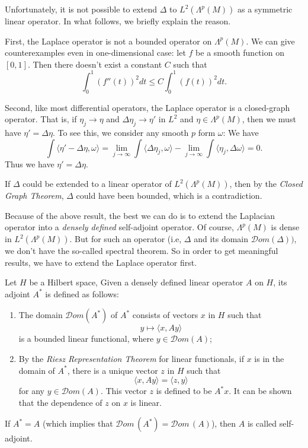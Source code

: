 Unfortunately, it is not possible to extend $\Delta$ to $L^2(\Lambda^p(M))$ as a symmetric linear operator. In what follows, we briefly explain the reason.


First, the Laplace operator is not a bounded operator on $\Lambda^p(M)$. We can give counterexamples even in one-dimensional case: let $f$ be a smooth function on $[0,1]$. Then there doesn't exist a constant $C$ such that
\[
\int_0^1(f''(t))^2 dt\leq C\int_0^1(f(t))^2 dt.
\]

Second, like most differential operators, the Laplace operator is a closed-graph operator. That is, if $\eta_j\to \eta$ and $\Delta\eta_j\to\eta'$ in $L^2$ and $\eta\in\Lambda^p(M)$, then we must have $\eta'=\Delta\eta$.
To see this, we consider any smooth $p$ form $\omega$:
We have 
\[
\int\langle\eta'-\Delta\eta,\omega\rangle=\lim_{j\to\infty}\int
\langle\Delta\eta_j,\omega\rangle-\lim_{j\to\infty}\int\langle\eta_j,\Delta\omega\rangle=0.
\]
Thus we have $\eta'=\Delta\eta$.

If $\Delta$ could be extended to a linear operator of $L^2(\Lambda^p(M))$, then by the {\it Closed
Graph Theorem}, $\Delta$ could have been bounded, which is a contradiction.

Because of the above result, the best we can do is to extend the Laplacian operator into a {\it densely defined} self-adjoint operator. Of course, $\Lambda^p(M)$ is dense in $L^2(\Lambda^p(M))$. But for such an operator (i.e, $\Delta$ and its domain ${\mathcal Dom}(\Delta))$, we don't have the so-called spectral theorem. So in order to get meaningful results, we have to extend the Laplace operator first. 

\begin{definition} Let $H$ be a Hilbert space, Given a densely defined linear operator $A$ on $H$, its adjoint $A^*$ is defined as follows:
\begin{enumerate}
\item The domain ${\mathcal Dom}(A^*)$ of $A^*$ consists of vectors $x$ in $H$ such that
\[
y\mapsto \langle x, Ay\rangle
\]
is a bounded linear functional, where $y\in{\mathcal Dom}(A)$;
\item By the {\it Riesz Representation Theorem} for linear functionals, if $x$ is in the domain of $A^*$, there is a unique vector $z$ in $H$ such that
\[
\langle x,Ay\rangle=\langle z,y\rangle
\]
for any $y\in {\mathcal Dom}(A)$.
This vector $z$ is defined to be $A^*x$. It can be shown that the dependence of $z$ on $x$ is linear.
\end{enumerate}
If $A^*=A$ (which implies that ${\mathcal Dom}\, (A^*)={\mathcal Dom}\,(A)$), then $A$ is called self-adjoint.
\end{definition}




